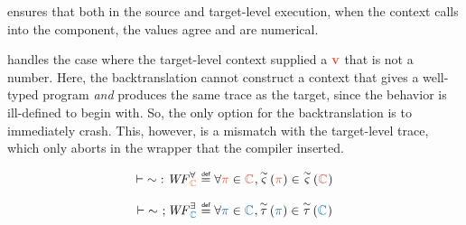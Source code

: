 \documentclass[a4paper,12pt]{article}
\begin{document}
\begin{center}
\end{center}
 ensures that both in the source and target-level execution, when the context calls into the component, the values agree and are numerical.

 handles the case where the target-level context supplied a $\trg{v}$ that is not a number.
Here, the backtranslation cannot construct a context that gives a well-typed program {\em and} produces the same trace as the target, since the behavior is ill-defined to begin with.
So, the only option for the backtranslation is to immediately crash.
This, however, is a mismatch with the target-level trace, which only aborts in the wrapper that the compiler inserted.

\begin{definition}{}
  \[
    \mapUniversalWF{\sim}{\trgClass} \isdef \forall \trgProperty\in\trgClass, \mapUniversal{\sim}{\trgProperty}\in\mapUniversal{\sim}{\trgClass}
  \]
\end{definition}
\begin{definition}{}
  \[
    \mapExistentialWF{\sim}{\srcClass} \isdef \forall \srcProperty\in\srcClass, \mapExistential{\sim}{\srcProperty}\in\mapExistential{\sim}{\srcClass}
  \]
\end{definition}
\end{document}
